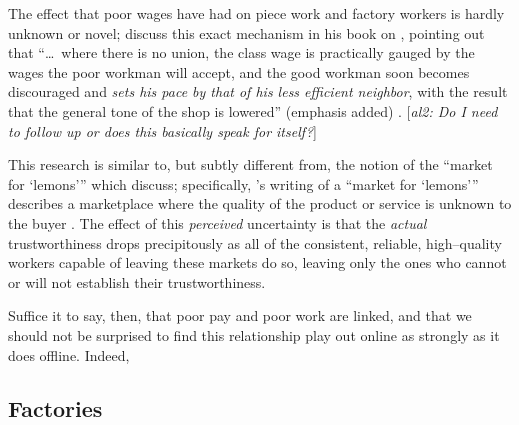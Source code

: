 \documentclass{sigchi}
\newcommand{\ali}[1]{{\color{BrickRed}[\textit{al2: #1}]}}
\begin{document}


The effect that poor wages have had on piece work and factory workers is hardly unknown or novel;
\citeauthor{gantt1913work} discuss this exact mechanism in his book on
, pointing out that
``\dots~where there is no union,
the class wage is practically gauged by the wages the poor workman will accept,
and the good workman soon becomes discouraged and \textit{sets his pace by that of his less efficient neighbor},
with the result that the general tone of the shop is lowered'' (emphasis added)
\cite{gantt1913work}.
\ali{Do I need to follow up or does this basically speak for itself?}

This research is similar to, but subtly different from, the notion of the ``market for `lemons'''
which \citeauthor{fort2011amazon} discuss;
specifically, \citeauthor{akerlof1970market}'s writing of a ``market for `lemons'''
describes a marketplace where the quality of the product or service is unknown to the buyer
\cite{fort2011amazon,akerlof1970market}.
The effect of this \textit{perceived} uncertainty is that
the \textit{actual} trustworthiness drops precipitously
as all of the consistent, reliable, high--quality workers capable of leaving these markets do so,
leaving only the ones who cannot or will not establish their trustworthiness.

Suffice it to say, then, that poor pay and poor work are linked,
and that we should not be surprised to find this relationship play out online as strongly as it does offline.
Indeed, 




\subsection{Factories}\label{sec:Factorization}
\end{document}
